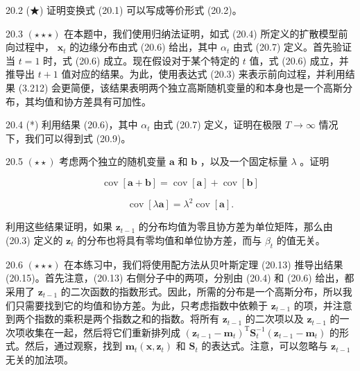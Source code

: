 \documentclass[10pt]{report}
\begin{document}
20.2 (★) 证明变换式 (20.1) 可以写成等价形式 (20.2)。

20.3 \(\left( {\star  \star   \star  }\right)\) 在本题中，我们使用归纳法证明，如式 (20.4) 所定义的扩散模型前向过程中， \({\mathbf{x}}_{t}\) 的边缘分布由式 (20.6) 给出，其中 \({\alpha }_{t}\) 由式 (20.7) 定义。首先验证当 \(t = 1\) 时，式 (20.6) 成立。现在假设对于某个特定的 \(t\) 值，式 (20.6) 成立，并推导出 \(t + 1\) 值对应的结果。为此，使用表达式 (20.3) 来表示前向过程，并利用结果 (3.212) 会更简便，该结果表明两个独立高斯随机变量的和本身也是一个高斯分布，其均值和协方差具有可加性。

20.4 (*) 利用结果 (20.6)，其中 \({\alpha }_{t}\) 由式 (20.7) 定义，证明在极限 \(T \rightarrow  \infty\) 情况下，我们可以得到式 (20.9)。

20.5 \(\left( {\star  \star  }\right)\) 考虑两个独立的随机变量 \(\mathbf{a}\) 和 \(\mathbf{b}\) ，以及一个固定标量 \(\lambda\) 。证明

\[
\operatorname{cov}\left\lbrack  {\mathbf{a} + \mathbf{b}}\right\rbrack   = \operatorname{cov}\left\lbrack  \mathbf{a}\right\rbrack   + \operatorname{cov}\left\lbrack  \mathbf{b}\right\rbrack   \tag{20.61}
\]

\[
\operatorname{cov}\left\lbrack  {\lambda \mathbf{a}}\right\rbrack   = {\lambda }^{2}\operatorname{cov}\left\lbrack  \mathbf{a}\right\rbrack  . \tag{20.62}
\]

利用这些结果证明，如果 \({\mathbf{z}}_{t - 1}\) 的分布均值为零且协方差为单位矩阵，那么由 (20.3) 定义的 \({\mathbf{z}}_{t}\) 的分布也将具有零均值和单位协方差，而与 \({\beta }_{t}\) 的值无关。

20.6 \(\left( {\star  \star   \star  }\right)\) 在本练习中，我们将使用配方法从贝叶斯定理 (20.13) 推导出结果 (20.15)。首先注意，(20.13) 右侧分子中的两项，分别由 (20.4) 和 (20.6) 给出，都采用了 \({\mathbf{z}}_{t - 1}\) 的二次函数的指数形式。因此，所需的分布是一个高斯分布，所以我们只需要找到它的均值和协方差。为此，只考虑指数中依赖于 \({\mathbf{z}}_{t - 1}\) 的项，并注意到两个指数的乘积是两个指数之和的指数。将所有 \({\mathbf{z}}_{t - 1}\) 的二次项以及 \({\mathbf{z}}_{t - 1}\) 的一次项收集在一起，然后将它们重新排列成 \({\left( {\mathbf{z}}_{t - 1} - {\mathbf{m}}_{t}\right) }^{\mathrm{T}}{\mathbf{S}}_{t}^{-1}\left( {{\mathbf{z}}_{t - 1} - {\mathbf{m}}_{t}}\right)\) 的形式。然后，通过观察，找到 \({\mathbf{m}}_{t}\left( {\mathbf{x},{\mathbf{z}}_{t}}\right)\) 和 \({\mathbf{S}}_{t}\) 的表达式。注意，可以忽略与 \({\mathbf{z}}_{t - 1}\) 无关的加法项。
\end{document}

